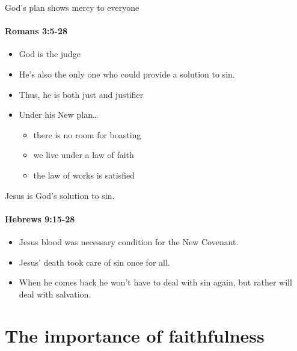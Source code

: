 \begin{frame}{God's plan shows mercy to everyone}
\framesubtitle{Romans 3:5-28}

\begin{itemize}
	\item God is the judge
	\item He's also the only one who could provide a solution to sin.
	\item Thus, he is both just and justifier
	\item Under his New plan\ldots
	\begin{itemize}
		\item there is no room for boasting
		\item we live under a law of faith
		\item the law of works is satisfied
	\end{itemize}
\end{itemize}

\end{frame}

\begin{frame}{Jesus is God's solution to sin.}
\framesubtitle{Hebrews 9:15-28}

\begin{itemize}
\item Jesus blood was necessary condition for the New Covenant.
\item Jesus' death took care of sin once for all.
\item When he comes back he won't have to deal with sin again, but rather will deal with salvation.
\end{itemize}

\end{frame}

\section{The importance of faithfulness}


